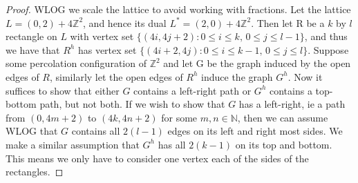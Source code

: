 \documentclass[a4paper,11pt]{article}
\theoremstyle{definition}
\newcommand{\ints}{\mathbb{Z}}
\begin{document}
\begin{proof}
	WLOG we scale the lattice to avoid working with fractions. Let the lattice $L = (0,2) + 4\ints^2$, and hence its dual $L^* = (2,0)+4\ints^2$. Then let R be a $k$ by $l$ rectangle on $L$ with vertex set $\{(4i,4j+2): 0 \leq i \leq k \text{, } 0 \leq j \leq l-1 \}$, and thus we have that $R^h$ has vertex set $\{(4i+2,4j): 0 \leq i \leq k-1 \text{, } 0 \leq j \leq l \}$. Suppose some percolation configuration of $\ints^2$ and let G be the graph induced by the open edges of $R$, similarly let the open edges of $R^h$ induce the graph $G^h$. Now it suffices to show that either $G$ contains a left-right path or $G^h$ contains a top-bottom path, but not both. If we wish to show that $G$ has a left-right, ie a path from $(0,4m+2)$ to $(4k,4n+2)$ for some $m,n \in \mathbb{N}$, then we can assume WLOG that $G$ contains all $2(l-1)$ edges on its left and right most sides. We make a similar assumption that $G^h$ has all $2(k-1)$ on its top and bottom. This means we only have to consider one vertex each of the sides of the rectangles.


\end{proof}
\end{document}

